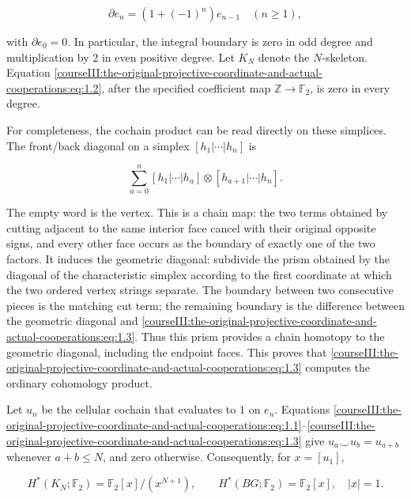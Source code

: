 \begin{equation}
\partial e_n=(1+(-1)^n)e_{n-1}\quad(n\geq1),
 \label{courseIII:the-original-projective-coordinate-and-actual-cooperations:eq:1.2}
\end{equation}

with \(\partial e_0=0\). In particular, the integral boundary is zero in odd degree and multiplication by \(2\) in even positive degree. Let \(K_N\) denote the \(N\)-skeleton. Equation \eqref{courseIII:the-original-projective-coordinate-and-actual-cooperations:eq:1.2}, after the specified coefficient map \(\mathbb Z\to\mathbb F_2\), is zero in every degree.

For completeness, the cochain product can be read directly on these simplices. The front/back diagonal on a simplex \([h_1|\cdots|h_n]\) is

\begin{equation}
\sum_{a=0}^n[h_1|\cdots|h_a]\otimes[h_{a+1}|\cdots|h_n].
 \label{courseIII:the-original-projective-coordinate-and-actual-cooperations:eq:1.3}
\end{equation}

The empty word is the vertex. This is a chain map: the two terms obtained by cutting adjacent to the same interior face cancel with their original opposite signs, and every other face occurs as the boundary of exactly one of the two factors. It induces the geometric diagonal: subdivide the prism obtained by the diagonal of the characteristic simplex according to the first coordinate at which the two ordered vertex strings separate. The boundary between two consecutive pieces is the matching cut term; the remaining boundary is the difference between the geometric diagonal and \eqref{courseIII:the-original-projective-coordinate-and-actual-cooperations:eq:1.3}. Thus this prism provides a chain homotopy to the geometric diagonal, including the endpoint faces. This proves that \eqref{courseIII:the-original-projective-coordinate-and-actual-cooperations:eq:1.3} computes the ordinary cohomology product.

Let \(u_n\) be the cellular cochain that evaluates to \(1\) on \(e_n\). Equations \eqref{courseIII:the-original-projective-coordinate-and-actual-cooperations:eq:1.1}--\eqref{courseIII:the-original-projective-coordinate-and-actual-cooperations:eq:1.3} give \(u_a\smile u_b=u_{a+b}\) whenever \(a+b\leq N\), and zero otherwise. Consequently, for \(x=[u_1]\),

\begin{equation}
H^*(K_N;\mathbb F_2)=\mathbb F_2[x]/(x^{N+1}),
 \qquad H^*(BG;\mathbb F_2)=\mathbb F_2[x],\quad |x|=1.
 \label{courseIII:the-original-projective-coordinate-and-actual-cooperations:eq:1.4}
\end{equation}

